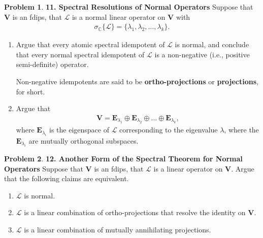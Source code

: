 \documentclass{book}
\theoremstyle{definition}
\newtheorem*{prob*}{Problem}
\newcommand{\V}{\mathbf{V}}
\newcommand{\lag}{\mathcal{L}}
\begin{document}
\newpage



\begin{prob*}\textbf{11. Spectral Resolutions of Normal Operators}
	Suppose that $\V$ is an fdips, that $\lag$ is a normal linear operator on $\V$ with 
	\begin{align*}
	\sigma_{\mathbb{C}}\{ \lag\} = \{\lambda_1, \lambda_2,\dots,\lambda_k\}.
	\end{align*}
	\begin{enumerate}
		\item Argue that every atomic spectral idempotent of $\lag$ is normal, and conclude that every normal spectral idempotent of $\lag$ is a non-negative (i.e., positive semi-definite) operator. 
		
		Non-negative idempotents are said to be \textbf{ortho-projections} or \textbf{projections}, for short. 
		
		\item Argue that 
		\begin{align*}
		\V = \mathbf{E}_{\lambda_1} \oplus \mathbf{E}_{\lambda_2} \oplus \dots \oplus \mathbf{E}_{\lambda_k},
		\end{align*}
		where $\mathbf{E}_{\lambda_i}$ is the eigenspace of $\lag$ corresponding to the eigenvalue $\lambda$, where the $\mathbf{E}_{\lambda_i}$ are mutually orthogonal subspaces.  
	\end{enumerate}
	
\end{prob*}







\newpage




\begin{prob*}\textbf{12. Another Form of the Spectral Theorem for Normal Operators}
	Suppose that $\V$ is an fdips, that $\lag$ is a linear operator on $\V$. Argue that the following claims are equivalent. 
	\begin{enumerate}
		\item $\lag$ is normal.
		\item $\lag$ is a linear combination of ortho-projections that resolve the identity on $\V$.
		\item $\lag$ is a linear combination of mutually annihilating projections. 
	\end{enumerate}
	
\end{prob*}
\end{document}

